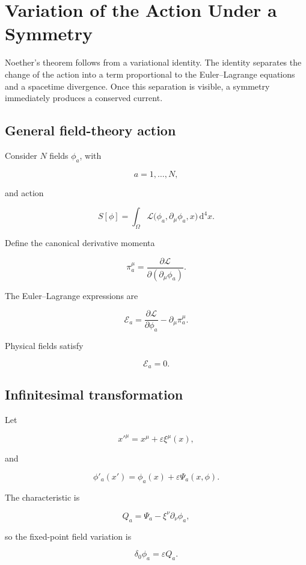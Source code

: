 \section{Variation of the Action Under a Symmetry}
\label{sec:variation_action_symmetry}

Noether's theorem follows from a variational identity. The identity separates the change of the action into a term proportional to the Euler--Lagrange equations and a spacetime divergence. Once this separation is visible, a symmetry immediately produces a conserved current.

\subsection{General field-theory action}

Consider \(N\) fields \(\phi_a\), with

\[
a=1,\ldots,N,
\]

and action

\[
\boxed{
S[\phi]
=
\int_{\Omega}
\mathcal{L}
\bigl(
\phi_a,
\partial_{\mu}\phi_a,
x
\bigr)
\,\mathrm{d}^{4}x
}.
\]

Define the canonical derivative momenta

\[
\boxed{
\pi_a^{\mu}
=
\frac{\partial\mathcal{L}}
{\partial(\partial_{\mu}\phi_a)}
}.
\]

The Euler--Lagrange expressions are

\[
\boxed{
\mathcal{E}_a
=
\frac{\partial\mathcal{L}}
{\partial\phi_a}
-
\partial_{\mu}\pi_a^{\mu}
}.
\]

Physical fields satisfy

\[
\mathcal{E}_a=0.
\]

\subsection{Infinitesimal transformation}

Let

\[
x'^{\mu}
=
x^{\mu}
+
\varepsilon\xi^{\mu}(x),
\]

and

\[
\phi'_a(x')
=
\phi_a(x)
+
\varepsilon\Psi_a(x,\phi).
\]

The characteristic is

\[
Q_a
=
\Psi_a
-
\xi^{\nu}\partial_{\nu}\phi_a,
\]

so the fixed-point field variation is

\[
\delta_0\phi_a
=
\varepsilon Q_a.
\]

